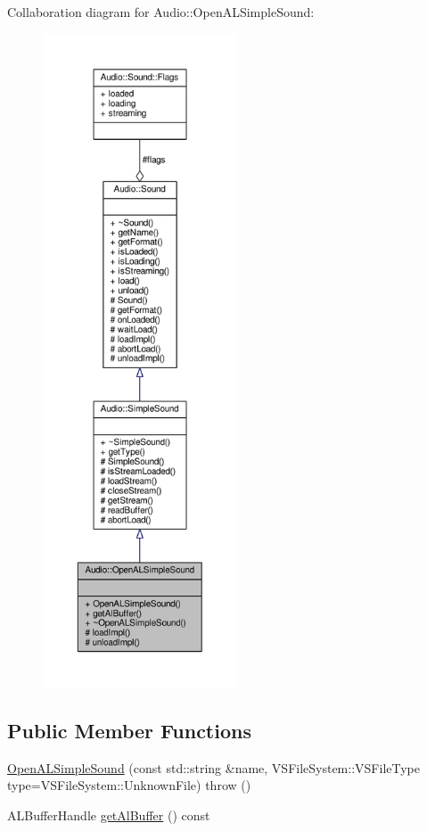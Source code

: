 Collaboration diagram for Audio\+:\+:Open\+A\+L\+Simple\+Sound\+:
\nopagebreak
\begin{figure}[H]
\begin{center}
\leavevmode
\includegraphics[height=550pt]{d3/d47/classAudio_1_1OpenALSimpleSound__coll__graph}
\end{center}
\end{figure}
\subsection*{Public Member Functions}
\begin{DoxyCompactItemize}
\item 
\hyperlink{classAudio_1_1OpenALSimpleSound_a86bc76d9a69435d7e20a781331f4b998}{Open\+A\+L\+Simple\+Sound} (const std\+::string \&name, V\+S\+File\+System\+::\+V\+S\+File\+Type type=V\+S\+File\+System\+::\+Unknown\+File)  throw ()
\item 
A\+L\+Buffer\+Handle \hyperlink{classAudio_1_1OpenALSimpleSound_a0742c186bb9a64bd24a4bb00944817dd}{get\+Al\+Buffer} () const 
\end{DoxyCompactItemize}
